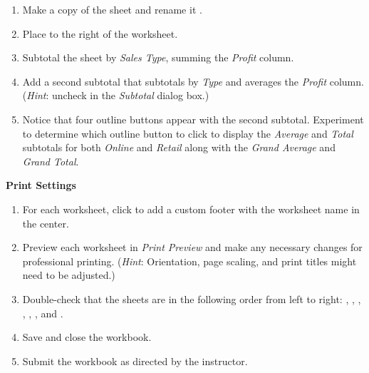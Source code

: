\begin{enumbox}
	\begin{enumerate}
		\item Make a copy of the  sheet and rename it . 
		\item Place  to the right of the  worksheet. 
		\item Subtotal the sheet by \textit{Sales Type}, summing the \textit{Profit} column.
		\item Add a second subtotal that subtotals by \textit{Type} and averages the \textit{Profit} column. (\textit{Hint}: uncheck  in the \textit{Subtotal} dialog box.) 
		\item Notice that four outline buttons appear with the second subtotal. Experiment to determine which outline button to click to display the \textit{Average} and \textit{Total} subtotals for both \textit{Online} and \textit{Retail} along with the \textit{Grand Average} and \textit{Grand Total}.
	\end{enumerate}
\end{enumbox}
	
\noindent
\textbf{Print Settings}

\begin{enumbox}
	\begin{enumerate}
		\item For each worksheet, click  to add a custom footer with the worksheet name in the center.
		\item Preview each worksheet in \textit{Print Preview} and make any necessary changes for professional printing. (\textit{Hint}: Orientation, page scaling, and print titles might need to be adjusted.)
		\item Double-check that the sheets are in the following order from left to right: , , , , , , and .
		\item Save and close the  workbook.
		\item Submit the  workbook as directed by the instructor.
	\end{enumerate}
\end{enumbox}